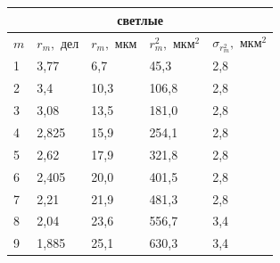 \documentclass[a4paper,12pt]{article} %
\begin{document}
\begin{table}[h!]
\begin{tabular}{|lllll|}
\hline
\multicolumn{5}{|c|}{светлые}                                                                                                                                                                 \\ \hline
\multicolumn{1}{|l|}{$m$} & \multicolumn{1}{l|}{$r_m, \text{ дел}$} & \multicolumn{1}{l|}{$r_m, \text{ мкм}$} & \multicolumn{1}{l|}{$r_m^2, \text{ мкм}^2$} & $\sigma_{r_{m}^2}, \text{ мкм}^2$ \\ \hline
\multicolumn{1}{|l|}{1}   & \multicolumn{1}{l|}{3,77}               & \multicolumn{1}{l|}{6,7}                & \multicolumn{1}{l|}{45,3}                   & 2,8                             \\ \hline
\multicolumn{1}{|l|}{2}   & \multicolumn{1}{l|}{3,4}                & \multicolumn{1}{l|}{10,3}               & \multicolumn{1}{l|}{106,8}                  & 2,8                             \\ \hline
\multicolumn{1}{|l|}{3}   & \multicolumn{1}{l|}{3,08}               & \multicolumn{1}{l|}{13,5}               & \multicolumn{1}{l|}{181,0}                  & 2,8                             \\ \hline
\multicolumn{1}{|l|}{4}   & \multicolumn{1}{l|}{2,825}              & \multicolumn{1}{l|}{15,9}               & \multicolumn{1}{l|}{254,1}                  & 2,8                             \\ \hline
\multicolumn{1}{|l|}{5}   & \multicolumn{1}{l|}{2,62}               & \multicolumn{1}{l|}{17,9}               & \multicolumn{1}{l|}{321,8}                  & 2,8                             \\ \hline
\multicolumn{1}{|l|}{6}   & \multicolumn{1}{l|}{2,405}              & \multicolumn{1}{l|}{20,0}               & \multicolumn{1}{l|}{401,5}                  & 2,8                             \\ \hline
\multicolumn{1}{|l|}{7}   & \multicolumn{1}{l|}{2,21}               & \multicolumn{1}{l|}{21,9}               & \multicolumn{1}{l|}{481,3}                  & 2,8                             \\ \hline
\multicolumn{1}{|l|}{8}   & \multicolumn{1}{l|}{2,04}               & \multicolumn{1}{l|}{23,6}               & \multicolumn{1}{l|}{556,7}                  & 3,4                             \\ \hline
\multicolumn{1}{|l|}{9}   & \multicolumn{1}{l|}{1,885}              & \multicolumn{1}{l|}{25,1}               & \multicolumn{1}{l|}{630,3}                  & 3,4                             \\ \hline

\end{tabular}
\end{table}
\end{document}
